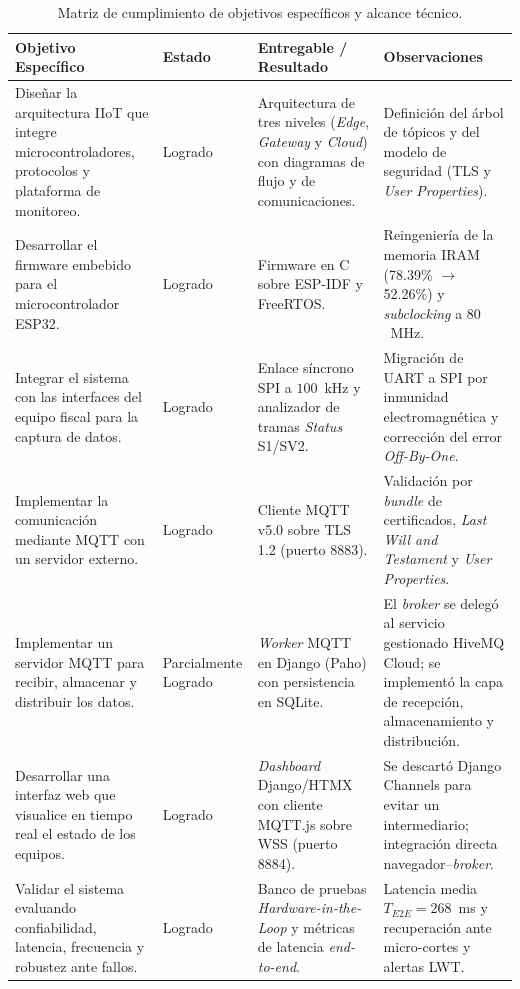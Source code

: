 \begin{table}[htbp]
\centering
\caption{Matriz de cumplimiento de objetivos específicos y alcance técnico.}
\label{tab:matriz_objetivos}
\footnotesize
\renewcommand{\arraystretch}{1.3}
\begin{tabularx}{\textwidth}{@{}>{\raggedright\arraybackslash}p{4.0cm} >{\raggedright\arraybackslash}p{2cm} >{\raggedright\arraybackslash}X >{\raggedright\arraybackslash}X@{}}
\toprule
\textbf{Objetivo Específico} & \textbf{Estado} & \textbf{Entregable / Resultado} & \textbf{Observaciones} \\
\midrule
Diseñar la arquitectura IIoT que integre microcontroladores, protocolos y plataforma de monitoreo. & Logrado & Arquitectura de tres niveles (\textit{Edge}, \textit{Gateway} y \textit{Cloud}) con diagramas de flujo y de comunicaciones. & Definición del árbol de tópicos y del modelo de seguridad (TLS y \textit{User Properties}). \\
Desarrollar el firmware embebido para el microcontrolador ESP32. & Logrado & Firmware en C sobre ESP-IDF y FreeRTOS. & Reingeniería de la memoria IRAM (78.39\% $\to$ 52.26\%) y \textit{subclocking} a $80$~MHz. \\
Integrar el sistema con las interfaces del equipo fiscal para la captura de datos. & Logrado & Enlace síncrono SPI a $100$~kHz y analizador de tramas \textit{Status} S1/SV2. & Migración de UART a SPI por inmunidad electromagnética y corrección del error \textit{Off-By-One}. \\
Implementar la comunicación mediante MQTT con un servidor externo. & Logrado & Cliente MQTT v5.0 sobre TLS 1.2 (puerto 8883). & Validación por \textit{bundle} de certificados, \textit{Last Will and Testament} y \textit{User Properties}. \\
Implementar un servidor MQTT para recibir, almacenar y distribuir los datos. & Parcialmente Logrado & \textit{Worker} MQTT en Django (Paho) con persistencia en SQLite. & El \textit{broker} se delegó al servicio gestionado HiveMQ Cloud; se implementó la capa de recepción, almacenamiento y distribución. \\
Desarrollar una interfaz web que visualice en tiempo real el estado de los equipos. & Logrado & \textit{Dashboard} Django/HTMX con cliente MQTT.js sobre WSS (puerto 8884). & Se descartó Django Channels para evitar un intermediario; integración directa navegador--\textit{broker}. \\
Validar el sistema evaluando confiabilidad, latencia, frecuencia y robustez ante fallos. & Logrado & Banco de pruebas \textit{Hardware-in-the-Loop} y métricas de latencia \textit{end-to-end}. & Latencia media $T_{E2E} = 268$~ms y recuperación ante micro-cortes y alertas LWT. \\

\end{tabularx}
\end{table}
